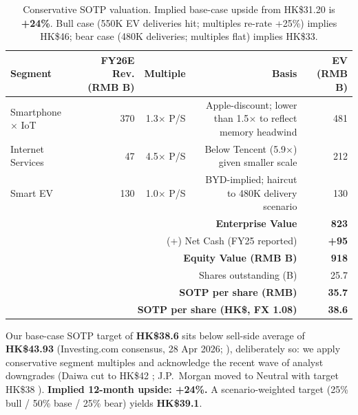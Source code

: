 \documentclass[11pt,a4paper]{article}
\begin{document}
\begin{table}[h]
\centering
\small
\begin{tabular}{lrrrr}
\toprule
\textbf{Segment} & \textbf{FY26E Rev. (RMB B)} & \textbf{Multiple} & \textbf{Basis} & \textbf{EV (RMB B)} \\
\midrule
Smartphone $\times$ IoT & 370 & 1.3$\times$ P/S & Apple-discount; lower than 1.5$\times$ to reflect memory headwind & 481 \\
Internet Services & 47 & 4.5$\times$ P/S & Below Tencent (5.9$\times$) given smaller scale & 212 \\
Smart EV & 130 & 1.0$\times$ P/S & BYD-implied; haircut to 480K delivery scenario & 130 \\
\midrule
\multicolumn{4}{r}{\textbf{Enterprise Value}} & \textbf{823} \\
\multicolumn{4}{r}{(+) Net Cash (FY25 reported)} & \textbf{+95} \\
\multicolumn{4}{r}{\textbf{Equity Value (RMB B)}} & \textbf{918} \\
\multicolumn{4}{r}{Shares outstanding (B)} & 25.7 \\
\multicolumn{4}{r}{\textbf{SOTP per share (RMB)}} & \textbf{35.7} \\
\multicolumn{4}{r}{\textbf{SOTP per share (HK\$, FX 1.08)}} & \textbf{38.6} \\
\bottomrule
\end{tabular}
\caption{Conservative SOTP valuation. Implied base-case upside from HK\$31.20 is \textbf{+24\%}. Bull case (550K EV deliveries hit; multiples re-rate +25\%) implies HK\$46; bear case (480K deliveries; multiples flat) implies HK\$33.}
\end{table}

\begin{keyfindingbox}
Our base-case SOTP target of \textbf{HK\$38.6} sits below sell-side average of \textbf{HK\$43.93} (Investing.com consensus, 28 Apr 2026; \cite{simplywallst2026xiaomi}), deliberately so: we apply conservative segment multiples and acknowledge the recent wave of analyst downgrades (Daiwa cut to HK\$42 \cite{daiwa2026xiaomi}; J.P.\ Morgan moved to Neutral with target HK\$38 \cite{jpm2026xiaomi}). \textbf{Implied 12-month upside: +24\%.} A scenario-weighted target (25\% bull / 50\% base / 25\% bear) yields \textbf{HK\$39.1}.
\end{keyfindingbox}
\end{document}

